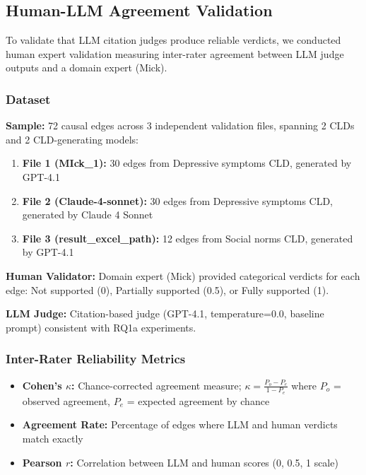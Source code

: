\subsection{Human-LLM Agreement Validation}

To validate that LLM citation judges produce reliable verdicts, we conducted human expert validation measuring inter-rater agreement between LLM judge outputs and a domain expert (Mick).

\subsubsection{Dataset}

\textbf{Sample:} 72 causal edges across 3 independent validation files, spanning 2 CLDs and 2 CLD-generating models:
\begin{enumerate}[noitemsep]
    \item \textbf{File 1 (MIck\_1):} 30 edges from Depressive symptoms CLD, generated by GPT-4.1
    \item \textbf{File 2 (Claude-4-sonnet):} 30 edges from Depressive symptoms CLD, generated by Claude 4 Sonnet
    \item \textbf{File 3 (result\_excel\_path):} 12 edges from Social norms CLD, generated by GPT-4.1
\end{enumerate}

\textbf{Human Validator:} Domain expert (Mick) provided categorical verdicts for each edge: Not supported (0), Partially supported (0.5), or Fully supported (1).

\textbf{LLM Judge:} Citation-based judge (GPT-4.1, temperature=0.0, baseline prompt) consistent with RQ1a experiments.

\subsubsection{Inter-Rater Reliability Metrics}

\begin{itemize}[noitemsep]
    \item \textbf{Cohen's $\kappa$:} Chance-corrected agreement measure; $\kappa = \frac{P_o - P_e}{1 - P_e}$ where $P_o$ = observed agreement, $P_e$ = expected agreement by chance
    \item \textbf{Agreement Rate:} Percentage of edges where LLM and human verdicts match exactly
    \item \textbf{Pearson $r$:} Correlation between LLM and human scores (0, 0.5, 1 scale)
\end{itemize}

